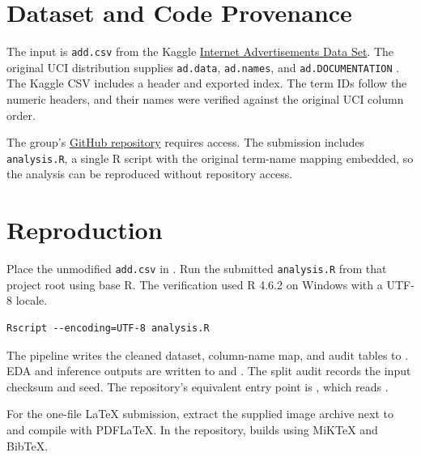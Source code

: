 \section{Dataset and Code Provenance}
The input is \texttt{add.csv} from the Kaggle
\href{https://www.kaggle.com/datasets/uciml/internet-advertisements-data-set/data}{Internet Advertisements Data Set}.
The original UCI distribution supplies \texttt{ad.data},
\texttt{ad.names}, and \texttt{ad.DOCUMENTATION}
\citep{kushmerick1999}. The Kaggle CSV includes a header and exported
index. The term IDs follow the numeric headers, and their names were
verified against the original UCI column order.

The group's
\href{https://github.com/thuyhienle0904/internet-ads-btl}{GitHub repository}
requires access. The submission includes \texttt{analysis.R}, a single R
script with the original term-name mapping embedded, so the analysis can
be reproduced without repository access.

\section{Reproduction}
Place the unmodified \texttt{add.csv} in . Run the
submitted \texttt{analysis.R} from that project root using base R.
The verification used R 4.6.2 on Windows with a UTF-8 locale.
\begin{lstlisting}[language={},caption={Command for reproducing the submitted analysis.}]
Rscript --encoding=UTF-8 analysis.R
\end{lstlisting}
The pipeline writes the cleaned dataset, column-name map, and audit
tables to . EDA and inference outputs are written
to  and . The split audit
records the input checksum and seed. The repository's equivalent
entry point is , which reads
.

For the one-file LaTeX submission, extract the supplied image archive
next to  and compile with PDFLaTeX. In the repository,
 builds  using MiKTeX and BibTeX.
